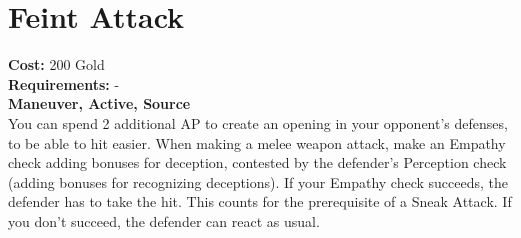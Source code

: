 \section*{Feint Attack}
\textbf{Cost:} 200 Gold\\
\textbf{Requirements:} -\\
\textbf{Maneuver, Active, Source}\\
You can spend 2 additional AP to create an opening in your opponent’s defenses, to be able to hit easier. When making a melee weapon attack, make an Empathy check adding bonuses for deception, contested by the defender’s Perception check (adding bonuses for recognizing deceptions). If your Empathy check succeeds, the defender has to take the hit. This counts for the prerequisite of a Sneak Attack. If you don’t succeed, the defender can react as usual.\\